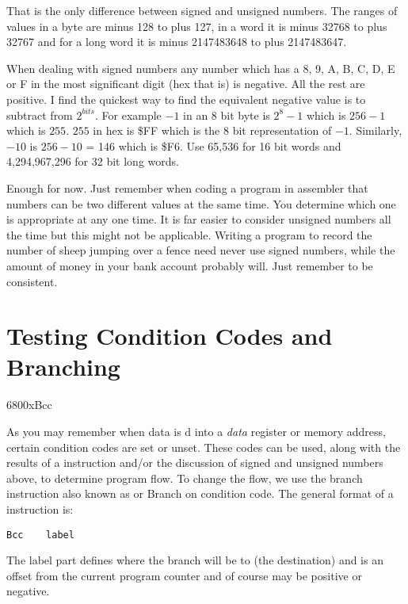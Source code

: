 That is the only difference between signed and unsigned numbers. The
    ranges of values in a byte are minus 128 to plus 127, in a word it is
    minus 32768 to plus 32767 and for a long word it is minus 2147483648 to
    plus 2147483647.

When dealing with signed numbers any number which has a 8, 9, A, B,
    C, D, E or F in the most significant digit (hex that is) is negative. All
    the rest are positive. I find the quickest way to find the equivalent
    negative value is to subtract from $2^{bits}$. For example $-1$ in an 8 bit byte is $2^{8}-1$ which is $256 -1$ which is $255$. $255$ in hex is \$FF which is
    the 8 bit representation of $-1$. Similarly, $-10$ is $256 -10$ = 146 which is
    \$F6. Use 65,536 for 16 bit words and 4,294,967,296 for 32 bit long words.

Enough for now. Just remember when coding a program in assembler
    that numbers can be two different values at the same time. You determine
    which one is appropriate at any one time. It is far easier to consider
    unsigned numbers all the time but this might not be applicable. Writing a
    program to record the number of sheep jumping over a fence need never use
    signed numbers, while the amount of money in your bank account probably
    will. Just remember to be consistent.

\section{Testing Condition Codes and Branching}\mc6800x{Bcc}
\label{ch2-testing-branching}%

As you may remember when data is d into a \emph{data} register or
memory address, certain condition codes are set or unset. These codes can be used, along
with the results of a  instruction and/or the discussion of signed and unsigned numbers
above, to determine program flow. To change the flow, we use the branch instruction also
known as  or Branch on condition code. The general format of a  instruction
is:

\begin{lstlisting}[firstnumber=1,]
          Bcc    label 
\end{lstlisting}

The label part defines where the branch will be to (the destination)
    and is an offset from the current program counter and of course may be
    positive or negative.

